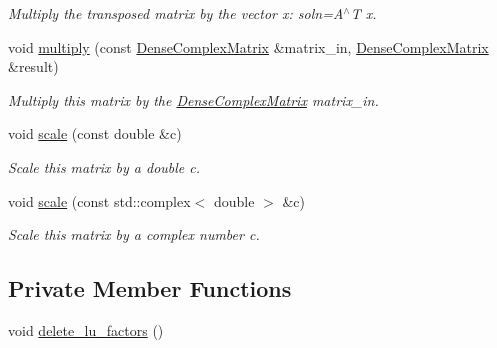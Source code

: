 \begin{DoxyCompactItemize}
\begin{DoxyCompactList}\small\item\em Multiply the transposed matrix by the vector x\+: soln=A$^\wedge$T x. \end{DoxyCompactList}\item 
void \hyperlink{classoomph_1_1DenseComplexMatrix_a2a7c992b599aeb9d43fda7f1ef63adaf}{multiply} (const \hyperlink{classoomph_1_1DenseComplexMatrix}{Dense\+Complex\+Matrix} \&matrix\+\_\+in, \hyperlink{classoomph_1_1DenseComplexMatrix}{Dense\+Complex\+Matrix} \&result)
\begin{DoxyCompactList}\small\item\em Multiply this matrix by the \hyperlink{classoomph_1_1DenseComplexMatrix}{Dense\+Complex\+Matrix} matrix\+\_\+in. \end{DoxyCompactList}\item 
void \hyperlink{classoomph_1_1DenseComplexMatrix_a2a4bb5a94aa40df66d3da02d63f71712}{scale} (const double \&c)
\begin{DoxyCompactList}\small\item\em Scale this matrix by a double c. \end{DoxyCompactList}\item 
void \hyperlink{classoomph_1_1DenseComplexMatrix_a49832bed306c52f822275b4c36cbe1d2}{scale} (const std\+::complex$<$ double $>$ \&c)
\begin{DoxyCompactList}\small\item\em Scale this matrix by a complex number c. \end{DoxyCompactList}\end{DoxyCompactItemize}
\subsection*{Private Member Functions}
\begin{DoxyCompactItemize}
\item 
void \hyperlink{classoomph_1_1DenseComplexMatrix_aae7ac20408c4459c59c505f1d40caa80}{delete\+\_\+lu\+\_\+factors} ()
\end{DoxyCompactItemize}
